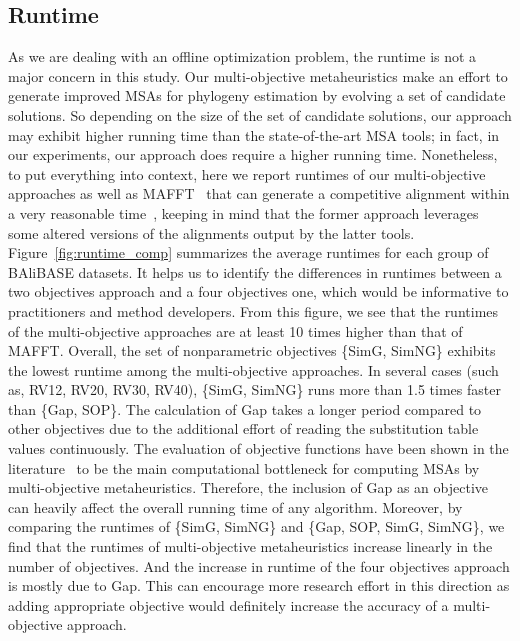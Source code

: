 \subsection{Runtime}\label{sec:run}
As we are dealing with an offline optimization problem, the runtime is not a major concern in this study. Our multi-objective metaheuristics make an effort to generate improved MSAs for phylogeny estimation by evolving a set of candidate solutions. So depending on the size of the set of candidate solutions, our approach may exhibit higher running time than the state-of-the-art MSA tools; in fact, in our experiments, our approach does require a higher running time. Nonetheless, to put everything into context, here we report runtimes of our multi-objective approaches as well as MAFFT~\citep{katoh2002mafft} that can generate a competitive alignment within a very reasonable time~\citep{ashkenazy2018multiple}, keeping in mind that the former approach leverages some altered versions of the alignments output by the latter tools. Figure~\ref{fig:runtime_comp} summarizes the average runtimes for each group of BAliBASE datasets. It helps us to identify the differences in runtimes between a two objectives approach and a four objectives one, which would be informative to practitioners and method developers. From this figure, we see that the runtimes of the multi-objective approaches are at least 10 times higher than that of MAFFT. Overall, the set of nonparametric objectives \{SimG, SimNG\} exhibits the lowest runtime among the multi-objective approaches. In several cases (such as, RV12, RV20, RV30, RV40), \{SimG, SimNG\} runs more than 1.5 times faster than \{Gap, SOP\}. The calculation of Gap takes a longer period compared to other objectives due to the additional effort of reading the substitution table values continuously. The evaluation of objective functions have been shown in the literature~\citep{zambrano2017m2align} to be the main computational bottleneck for computing MSAs by multi-objective metaheuristics. Therefore, the inclusion of Gap as an objective can heavily affect the overall running time of any algorithm. Moreover, by comparing the runtimes of \{SimG, SimNG\} and \{Gap, SOP, SimG, SimNG\}, we find that the runtimes of multi-objective metaheuristics increase linearly in the number of objectives. And the increase in runtime of the four objectives approach is mostly due to Gap. This can encourage more research effort in this direction as adding appropriate objective would definitely increase the accuracy of a multi-objective approach.

